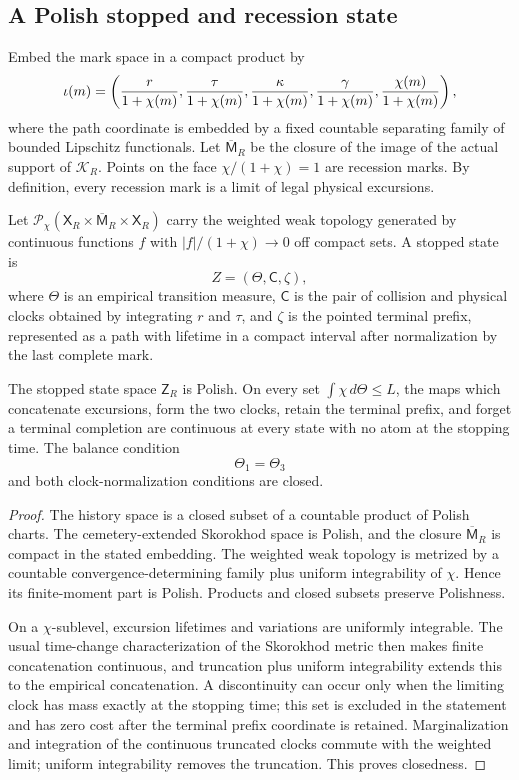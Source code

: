\subsection{A Polish stopped and recession state}

Embed the mark space in a compact product by
\[
 \iota(m)=\left({r\over1+\chi(m)},
 {\tau\over1+\chi(m)},
 {\kappa\over1+\chi(m)},
 {\gamma\over1+\chi(m)},
 {\chi(m)\over1+\chi(m)}\right),
\]
where the path coordinate is embedded by a fixed countable separating family
of bounded Lipschitz functionals.  Let $\overline{\mathsf M}_R$ be the closure
of the image of the actual support of $\mathcal K_R$.  Points on the face
$\chi/(1+\chi)=1$ are recession marks.  By definition, every recession mark
is a limit of legal physical excursions.

Let $\mathcal P_\chi(\mathsf X_R\times\overline{\mathsf M}_R\times
\mathsf X_R)$ carry the weighted weak topology generated by continuous
functions $f$ with $|f|/(1+\chi)\to0$ off compact sets.  A stopped state is
\[
 Z=(\Theta,\mathsf C,\zeta),
\]
where $\Theta$ is an empirical transition measure, $\mathsf C$ is the pair of
collision and physical clocks obtained by integrating $r$ and $\tau$, and
$\zeta$ is the pointed terminal prefix, represented as a path with lifetime
in a compact interval after normalization by the last complete mark.

\begin{proposition}
\label{prop:r21-a3-space}
The stopped state space $\mathsf Z_R$ is Polish.  On every set
$\int\chi\,d\Theta\le L$, the maps which concatenate excursions, form the two
clocks, retain the terminal prefix, and forget a terminal completion are
continuous at every state with no atom at the stopping time.  The balance
condition
\[
 \Theta_1=\Theta_3
\]
and both clock-normalization conditions are closed.
\end{proposition}

\begin{proof}
The history space is a closed subset of a countable product of Polish charts.
The cemetery-extended Skorokhod space is Polish, and the closure
$\overline{\mathsf M}_R$ is compact in the stated embedding.  The weighted
weak topology is metrized by a countable convergence-determining family plus
uniform integrability of $\chi$.  Hence its finite-moment part is Polish.
Products and closed subsets preserve Polishness.

On a $\chi$-sublevel, excursion lifetimes and variations are uniformly
integrable.  The usual time-change characterization of the Skorokhod metric
then makes finite concatenation continuous, and truncation plus uniform
integrability extends this to the empirical concatenation.  A discontinuity
can occur only when the limiting clock has mass exactly at the stopping time;
this set is excluded in the statement and has zero cost after the terminal
prefix coordinate is retained.  Marginalization and integration of the
continuous truncated clocks commute with the weighted limit; uniform
integrability removes the truncation.  This proves closedness.
\end{proof}

